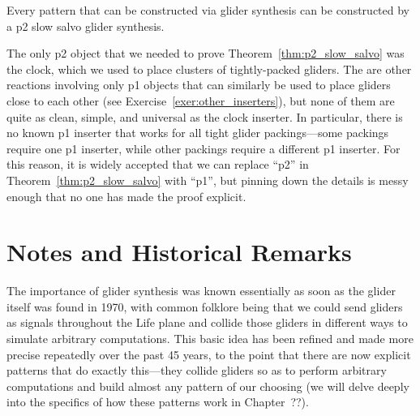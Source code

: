\begin{theorem}\label{thm:p2_slow_salvo}
	Every pattern that can be constructed via glider synthesis can be constructed by a p2 slow salvo glider synthesis.
\end{theorem}

The only p2 object that we needed to prove Theorem~\ref{thm:p2_slow_salvo} was the clock, which we used to place clusters of tightly-packed gliders. The are other reactions involving only p1 objects that can similarly be used to place gliders close to each other (see Exercise~\ref{exer:other_inserters}), but none of them are quite as clean, simple, and universal as the clock inserter. In particular, there is no known p1 inserter that works for all tight glider packings---some packings require one p1 inserter, while other packings require a different p1 inserter. For this reason, it is widely accepted that we can replace ``p2'' in Theorem~\ref{thm:p2_slow_salvo} with ``p1'', but pinning down the details is messy enough that no one has made the proof explicit.



\section*{Notes and Historical Remarks}
\label{sec:synthesis_notes}

The importance of glider synthesis was known essentially as soon as the glider itself was found in 1970, with common folklore being that we could send gliders as signals throughout the Life plane and collide those gliders in different ways to simulate arbitrary computations. This basic idea has been refined and made more precise repeatedly over the past 45 years, to the point that there are now explicit patterns that do exactly this---they collide gliders so as to perform arbitrary computations and build almost any pattern of our choosing (we will delve deeply into the specifics of how these patterns work in Chapter~??).

